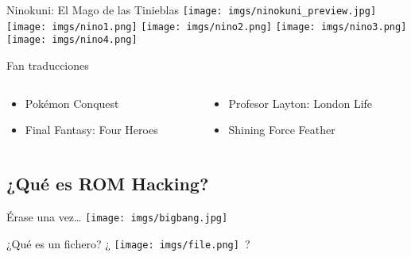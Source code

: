 \begin{frame}{Ninokuni: El Mago de las Tinieblas}
    \centering
    \texttt{[image: imgs/ninokuni\_preview.jpg]}
    \vfill
    \texttt{[image: imgs/nino1.png]}
    \hfill
    \texttt{[image: imgs/nino2.png]}
    \hfill
    \texttt{[image: imgs/nino3.png]}
    \hfill
    \texttt{[image: imgs/nino4.png]}
\end{frame}

\begin{frame}{Fan traducciones}
    \setlength{\leftmargini}{0em}
    \begin{columns}
    \begin{column}{0.5\textwidth}
        \begin{itemize}
            \item<1-> Pokémon Conquest
            \item<2-> Final Fantasy: Four Heroes
        \end{itemize}
        \vfill
        \hfill
    \end{column}
    \begin{column}{0.5\textwidth}
        \hfill
        \vfill
        \begin{itemize}
            \item<3-> Profesor Layton: London Life
            \item<4-> Shining Force Feather
        \end{itemize}
    \end{column}
    \end{columns}
\end{frame}

\subsection{¿Qué es ROM Hacking?}
\begin{frame}{Érase una vez\ldots}
    \centering \texttt{[image: imgs/bigbang.jpg]}
\end{frame}

\begin{frame}{¿Qué es un fichero?}
    \centering\fontsize{80}{0}\selectfont
    ¿ \texttt{[image: imgs/file.png]}~?
\end{frame}

